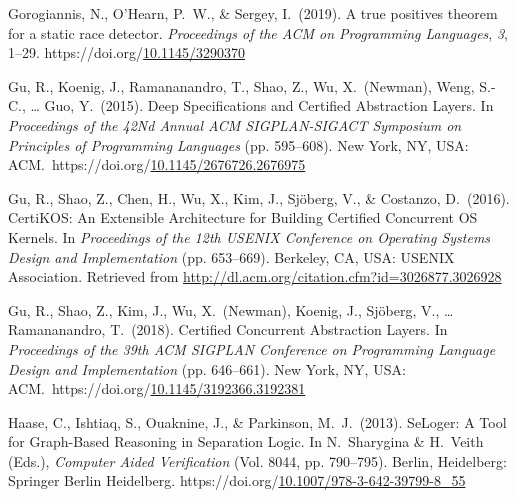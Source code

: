 \documentclass[12pt,twoside]{article}
\begin{document}
{\begin{thebibliography}{222}
\mdbibitemlabel{}Gorogiannis, N., O’Hearn, P.~W., \& Sergey, I.~(2019). A true positives theorem for a static race detector. \emph{Proceedings of the ACM on Programming Languages}, \emph{3}, 1–29. https://doi.org/\href{https://dx.doi.org/10.1145/3290370}{10.1145/3290370}\label{gorogiannis_true_2019}%

\mdbibitemlabel{}Gu, R., Koenig, J., Ramananandro, T., Shao, Z., Wu, X.~(Newman), Weng, S.-C., … Guo, Y.~(2015). Deep Specifications and Certified Abstraction Layers. In \emph{Proceedings of the 42Nd Annual ACM SIGPLAN-SIGACT Symposium on Principles of Programming Languages} (pp. 595–608). New York, NY, USA: ACM.~https://doi.org/\href{https://dx.doi.org/10.1145/2676726.2676975}{10.1145/2676726.2676975}\label{gu_deep_2015}%

\mdbibitemlabel{}Gu, R., Shao, Z., Chen, H., Wu, X., Kim, J., Sjöberg, V., \& Costanzo, D.~(2016). CertiKOS: An Extensible Architecture for Building Certified Concurrent OS Kernels. In \emph{Proceedings of the 12th USENIX Conference on Operating Systems Design and Implementation} (pp. 653–669). Berkeley, CA, USA: USENIX Association. Retrieved from \href{http://dl.acm.org/citation.cfm?id=3026877.3026928}{{\ttfamily http://\hspace{0pt}dl.\hspace{0pt}acm.\hspace{0pt}org/\hspace{0pt}citation.\hspace{0pt}cfm?\hspace{0pt}id=\hspace{0pt}3026877.\hspace{0pt}3026928}}\label{gu_certikos:_2016}%

\mdbibitemlabel{}Gu, R., Shao, Z., Kim, J., Wu, X.~(Newman), Koenig, J., Sjöberg, V., … Ramananandro, T.~(2018). Certified Concurrent Abstraction Layers. In \emph{Proceedings of the 39th ACM SIGPLAN Conference on Programming Language Design and Implementation} (pp. 646–661). New York, NY, USA: ACM.~https://doi.org/\href{https://dx.doi.org/10.1145/3192366.3192381}{10.1145/3192366.3192381}\label{gu_certified_2018}%

\mdbibitemlabel{}Haase, C., Ishtiaq, S., Ouaknine, J., \& Parkinson, M.~J.~(2013). SeLoger: A Tool for Graph-Based Reasoning in Separation Logic. In N.~Sharygina \& H.~Veith (Eds.), \emph{Computer Aided Verification} (Vol. 8044, pp. 790–795). Berlin, Heidelberg: Springer Berlin Heidelberg. https://doi.org/\href{https://dx.doi.org/10.1007/978-3-642-39799-8_55}{10.1007/978-3-642-39799-8\_55}\label{hutchison_seloger:_2013}%


\end{thebibliography}}
\end{document}
